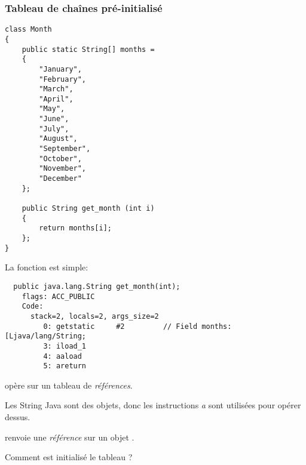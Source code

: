 \subsubsection{Tableau de chaînes pré-initialisé}
\label{Java_2D_array_month}

\begin{lstlisting}[style=customjava]
class Month
{
	public static String[] months =
	{
		"January",
		"February",
		"March",
		"April",
		"May",
		"June",
		"July",
		"August",
		"September",
		"October",
		"November",
		"December"
	};

	public String get_month (int i)
	{
		return months[i];
	};
}
\end{lstlisting}

La fonction  est simple:

\begin{lstlisting}
  public java.lang.String get_month(int);
    flags: ACC_PUBLIC
    Code:
      stack=2, locals=2, args_size=2
         0: getstatic     #2         // Field months:[Ljava/lang/String;
         3: iload_1
         4: aaload
         5: areturn
\end{lstlisting}

 opère sur un tableau de \emph{références}.

Les String Java sont des objets, donc les instructions \emph{a} sont utilisées pour
opérer dessus.

 renvoie une \emph{référence} sur un objet .

Comment est initialisé le tableau ?

